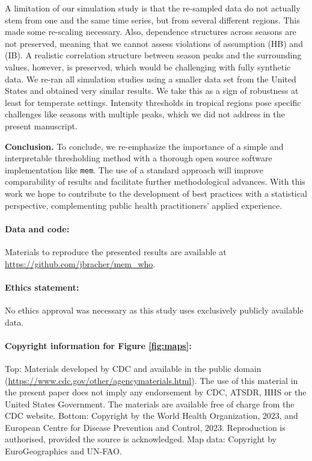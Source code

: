 \documentclass[12pt]{article}
\begin{document}
A limitation of our simulation study is that the re-sampled data do not actually stem from one and the same time series, but from several different regions. This made some re-scaling necessary. Also, dependence structures across seasons are not preserved, meaning that we cannot assess violations of assumption (HB) and (IB). A realistic correlation structure between season peaks and the surrounding values, however, is preserved, which would be challenging with fully synthetic data. We re-ran all simulation studies using a smaller data set from the United States and obtained very similar results. We take this as a sign of robustness at least for temperate settings. Intensity thresholds in tropical regions pose specific challenges like seasons with multiple peaks, which we did not address in the present manuscript.

\noindent \textbf{Conclusion.} To conclude, we re-emphasize the importance of a simple and interpretable thresholding method with a thorough open source software implementation like \texttt{mem}. The use of a standard approach will improve comparability of results and facilitate further methodological advances. With this work we hope to contribute to the development of best practices  with a statistical perspective, complementing public health practitioners' applied experience.

\paragraph{Data and code:} Materials to reproduce the presented results are available at \url{https://github.com/jbracher/mem_who}.

\paragraph{Ethics statement:} No ethics approval was necessary as this study uses exclusively publicly available data.

\paragraph{Copyright information for Figure \ref{fig:maps}:}

Top: Materials developed by CDC and available in the public domain (\url{https://www.cdc.gov/other/agencymaterials.html}). The use of this material in the present paper does not imply any endorsement by CDC, ATSDR, HHS or the United States Government. The materials are available free of charge from the CDC website. Bottom: Copyright by the World Health Organization, 2023, and European Centre for Disease Prevention and Control, 2023. Reproduction is authorised, provided the source is acknowledged. Map data: Copyright by EuroGeographics and UN-FAO. 
\end{document}
